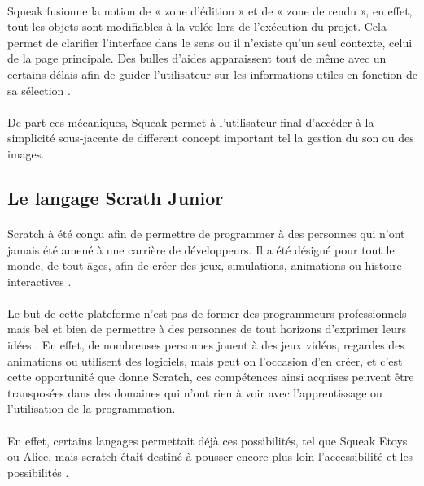 \documentclass[a4paper]{article}
\begin{document}
\paragraph{}
Squeak fusionne la notion de « zone d’édition » et de « zone de rendu », en effet, tout les objets sont modifiables à la volée lors de l’exécution du projet. Cela permet de clarifier l’interface dans le sens ou il n’existe qu’un seul contexte, celui de la page principale. Des bulles d’aides apparaissent tout de même avec un certains délais afin de guider l’utilisateur sur les informations utiles en fonction de sa sélection \cite{yatim2007educating}.

\paragraph{}
De part ces mécaniques, Squeak permet à l’utilisateur final d’accéder à la simplicité sous-jacente de different concept important tel la gestion du son ou des images.

\subsection{Le langage Scrath Junior}

\paragraph{}
Scratch à été conçu afin  de permettre de programmer à des personnes qui n’ont jamais été amené à une carrière de développeurs. Il a été désigné pour tout le monde, de tout âges, afin de créer des jeux, simulations, animations ou histoire interactives \cite{Maloney:2010:SPL:1868358.1868363}.

\paragraph{}
Le but de cette plateforme n’est pas de former des programmeurs professionnels mais bel et bien de permettre à des personnes de tout horizons d’exprimer leurs idées \cite{resnick2009scratch}. En effet, de nombreuses personnes jouent à des jeux vidéos, regardes des animations ou utilisent des logiciels, mais peut on l’occasion d’en créer, et c’est cette opportunité que donne Scratch, ces compétences ainsi acquises peuvent être transposées dans des domaines qui n’ont rien à voir avec l’apprentissage ou l’utilisation de la programmation.

\paragraph{}
En effet, certains langages permettait déjà ces possibilités, tel que Squeak Etoys ou Alice, mais scratch était destiné à pousser encore plus loin l’accessibilité et les possibilités \cite{resnick2009scratch}.
\end{document}
